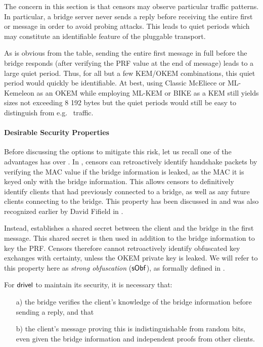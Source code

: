 The concern in this section is that censors may observe particular traffic patterns. In particular, a bridge server never sends a reply before receiving the entire first \drivel{} or \obfsfour{} message in order to avoid probing attacks. This leads to quiet periods which may constitute an identifiable feature of the pluggable transport.

As is obvious from the table, sending the entire first \drivel{} message in full before the bridge responds (after verifying the PRF value at the end of message) leads to a large quiet period. Thus, for all but a few KEM/OKEM combinations, this quiet period would quickly be identifiable. At best, using Classic McEliece or ML-Kemeleon as an OKEM while employing ML-KEM or BIKE as a KEM still yields sizes not exceeding 8 192 bytes but the quiet periods would still be easy to distinguish from e.g.~\obfsfour{} traffic.

\paragraph{Desirable Security Properties}
Before discussing the options to mitigate this risk, let us recall one of the advantages \drivel{} has over \obfsfour{}. In \obfsfour{}, censors can retroactively identify handshake packets by verifying the MAC value if the bridge information is leaked, as the MAC it is keyed only with the bridge information. This allows censors to definitively identify clients that had previously connected to a bridge, as well as any future clients connecting to the bridge. This property has been discussed in \cite[Section~6]{CCS:GunSteVei24} and was also recognized earlier by David Fifield in \cite{obfs4-pk-reveal-distinguisher}.

Instead, \drivel{} establishes a shared secret between the client and the bridge in the first message. This shared secret is then used in addition to the bridge information to key the PRF. Censors therefore cannot retroactively identify obfuscated key exchanges with certainty, unless the OKEM private key is leaked. We will refer to this property here as \emph{strong obfuscation} ($\mathsf{sObf}$), as formally defined in \cite{CCS:GunSteVei24}.

For $\textsf{drivel}$ to maintain its security, it is necessary that:
\begin{itemize}
    \item[a)] the bridge verifies the client's knowledge of the bridge information before sending a reply, and that
    \item[b)] the client's message proving this is indistinguishable from random bits, even given the bridge information and independent proofs from other clients.
\end{itemize}

